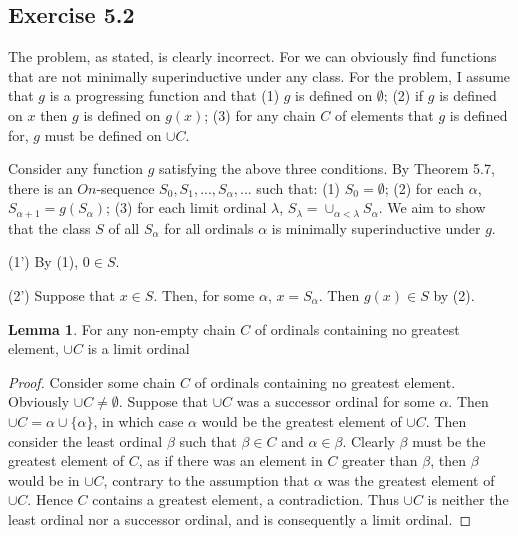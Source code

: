 \documentclass{article}
\theoremstyle{definition}
\newtheorem{lemma}[theorem]{Lemma}
\begin{document}
\subsection*{Exercise 5.2}
The problem, as stated, is clearly incorrect. For we can obviously find functions that are not minimally superinductive under any class. For the problem, I assume 
that $g$ is a progressing function and that (1) $g$ is defined on $\emptyset$; (2) if $g$ is defined on $x$ then $g$ is defined on $g(x)$; 
(3) for any chain $C$ of elements that $g$ is defined for, $g$ must be defined on $\cup C$.

Consider any function $g$ satisfying the above three conditions. By Theorem 5.7, there is an $On$-sequence $S_0,S_1,...,S_\alpha,...$ such that:\newline
(1) $S_0=\emptyset$;\newline
(2) for each $\alpha$, $S_{\alpha+1}=g(S_\alpha)$;\newline
(3) for each limit ordinal $\lambda$, $S_\lambda=\cup_{\alpha<\lambda}S_\alpha$.\newline
We aim to show that the class $S$ of all $S_\alpha$ for all ordinals $\alpha$ is minimally superinductive under $g$.

(1') By (1), $0\in S$.\newline

(2') Suppose that $x\in S$. Then, for some $\alpha$, $x=S_\alpha$. Then $g(x)\in S$ by (2).\newline

\begin{lemma}
For any non-empty chain $C$ of ordinals containing no greatest element, $\cup C$ is a limit ordinal
\end{lemma}
\begin{proof}
Consider some chain $C$ of ordinals containing no greatest element. Obviously $\cup C\ne\emptyset$. Suppose that 
$\cup C$ was a successor ordinal for some $\alpha$. Then $\cup C=\alpha\cup\{\alpha\}$, in which case $\alpha$ would be the greatest 
element of $\cup C$. Then consider the least ordinal $\beta$ such that $\beta\in C$ and $\alpha\in\beta$. Clearly $\beta$ must be the 
greatest element of $C$, as if there was an element in $C$ greater than $\beta$, then $\beta$ would be in $\cup C$, contrary to the assumption that 
$\alpha$ was the greatest element of $\cup C$. Hence $C$ contains a greatest element, a contradiction. Thus $\cup C$ is neither the least ordinal 
nor a successor ordinal, and is consequently a limit ordinal. 
\end{proof}
\end{document}
